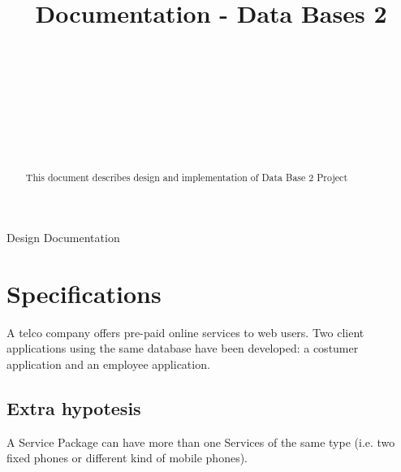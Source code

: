 \documentclass{article}
\begin{document}
\lstset{language=SQL}
\title{Documentation - Data Bases 2%
%
}

\author{\\[2pt] 
\\
\\
\and
\\
\\
\\
}

%
%
{Design Documentation}

\maketitle

\begin{abstract}
This document describes design and implementation of Data Base 2 Project
\end{abstract}

\section{Specifications}
\label{intro}
A telco company offers pre-paid online services to web users. Two client applications using the same database have been developed: a costumer application and an employee application.
\subsection{Extra hypotesis}
A Service Package can have more than one Services of the same type (i.e. two fixed phones or different kind of mobile phones).
\end{document}
